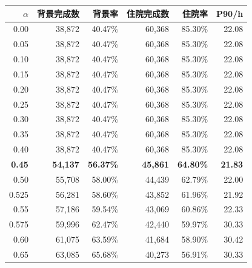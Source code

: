 \begin{tabular}{rrrrrr}
\toprule
$\alpha$ & 背景完成数 & 背景率 & 住院完成数 & 住院率 & P90/h \\
\midrule
0.00 & 38,872 & 40.47\% & 60,368 & 85.30\% & 22.08 \\
0.05 & 38,872 & 40.47\% & 60,368 & 85.30\% & 22.08 \\
0.10 & 38,872 & 40.47\% & 60,368 & 85.30\% & 22.08 \\
0.15 & 38,872 & 40.47\% & 60,368 & 85.30\% & 22.08 \\
0.20 & 38,872 & 40.47\% & 60,368 & 85.30\% & 22.08 \\
0.25 & 38,872 & 40.47\% & 60,368 & 85.30\% & 22.08 \\
0.30 & 38,872 & 40.47\% & 60,368 & 85.30\% & 22.08 \\
0.35 & 38,872 & 40.47\% & 60,368 & 85.30\% & 22.08 \\
0.40 & 38,872 & 40.47\% & 60,368 & 85.30\% & 22.08 \\
\textbf{0.45} & \textbf{54,137} & \textbf{56.37\%} & \textbf{45,861} & \textbf{64.80\%} & \textbf{21.83} \\
0.50 & 55,708 & 58.00\% & 44,439 & 62.79\% & 22.00 \\
0.525 & 56,281 & 58.60\% & 43,852 & 61.96\% & 21.92 \\
0.55 & 57,186 & 59.54\% & 43,069 & 60.86\% & 22.33 \\
0.575 & 59,996 & 62.47\% & 42,440 & 59.97\% & 30.33 \\
0.60 & 61,075 & 63.59\% & 41,684 & 58.90\% & 30.42 \\
0.65 & 63,085 & 65.68\% & 40,273 & 56.91\% & 30.33 \\
\bottomrule
\end{tabular}
